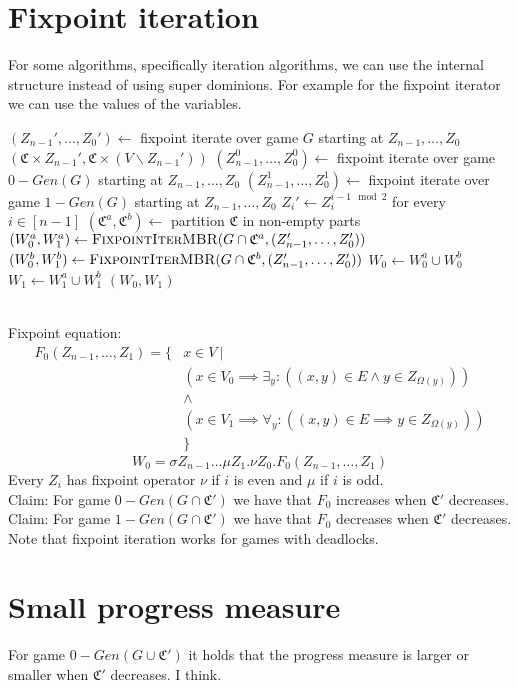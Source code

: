 \documentclass[]{article}
\begin{document}
\section{Fixpoint iteration}
For some algorithms, specifically iteration algorithms, we can use the internal structure instead of using super dominions. For example for the fixpoint iterator we can use the values of the variables.\\
\begin{algorithm}
	\caption{$\textsc{FixpointIterMBR}(G, (Z_{n-1}, \dots, Z_0))$}
	\begin{algorithmic}[1]
			\State $(Z_{n-1}',\dots,Z_0') \gets $ fixpoint iterate over game $G$ starting at $Z_{n-1},\dots,Z_0$
			\State \Return $(\mathfrak{C} \times Z_{n-1}', \mathfrak{C} \times (V \backslash Z_{n-1}'))$
		\EndIf
		\State $(Z_{n-1}^0,\dots,Z_0^0) \gets $ fixpoint iterate over game $0{-}Gen(G)$ starting at $Z_{n-1},\dots,Z_0$
		\State $(Z_{n-1}^1,\dots,Z_0^1) \gets $ fixpoint iterate over game $1{-}Gen(G)$ starting at $Z_{n-1},\dots,Z_0$
		\State $Z_i' \gets Z_i^{i - 1 \mod 2}$ for every $i \in [n-1]$
		\State $(\mathfrak{C}^a,\mathfrak{C}^b) \gets$ partition $\mathfrak{C}$ in non-empty parts
		\State $(W_0^a, W_1^a) \gets \textsc{FixpointIterMBR}(G \cap \mathfrak{C}^a,(Z_{n-1}',\dots,Z_0'))$
		\State $(W_0^b, W_1^b) \gets \textsc{FixpointIterMBR}(G \cap \mathfrak{C}^b,(Z_{n-1}',\dots,Z_0'))$
		\State $W_0 \gets W_0^a \cup W_0^b$
		\State $W_1 \gets W_1^a \cup W_1^b$
		\State \Return $(W_0,W_1)$
	\end{algorithmic}
\end{algorithm}\\
Fixpoint equation:
\begin{align*}
F_0(Z_{n-1}, \dots, Z_1) = \{&x\in V\ |\ \\
&(x \in V_0 \implies \exists_y : ((x,y) \in E \wedge y \in Z_{\Omega(y)} ))\\
& \wedge\\
&(x \in V_1 \implies \forall_y : ((x,y) \in E \implies y \in Z_{\Omega(y)}))\\
&\}
\end{align*}
\[ W_0 = \sigma Z_{n-1}\dots \mu Z_1. \nu Z_0.F_0(Z_{n-1}, \dots, Z_1) \]
Every $Z_i$ has fixpoint operator $\nu$ if $i$ is even and $\mu$ if $i$ is odd.\\
Claim: For game $0{-}Gen(G \cap \mathfrak{C}')$ we have that $F_0$ increases when $\mathfrak{C}'$ decreases.\\
Claim: For game $1{-}Gen(G \cap \mathfrak{C}')$ we have that $F_0$ decreases when $\mathfrak{C}'$ decreases.\\
Note that fixpoint iteration works for games with deadlocks.

\section{Small progress measure}
For game $0{-}Gen(G\cup\mathfrak{C}')$ it holds that the progress measure is larger or smaller when $\mathfrak{C}'$ decreases. I think.
\end{document}
